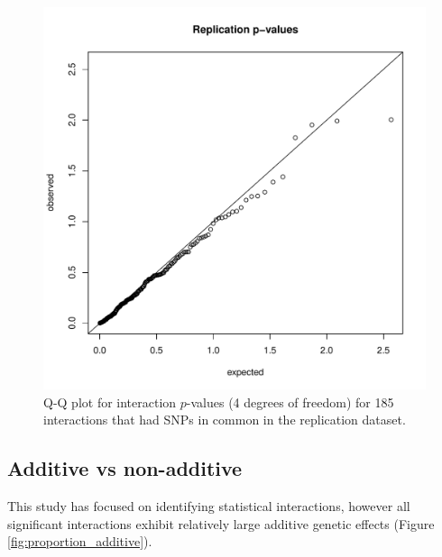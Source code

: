 \documentclass[paper=a4, fontsize=11pt]{scrartcl}	%
\numberwithin{equation}{section}									%
\numberwithin{figure}{section}										%
\numberwithin{table}{section}										%
\begin{document}
\begin{figure}[p]
	\centering
	\includegraphics[width=15cm]{images/replication_qqplot}
	\caption{Q-Q plot for interaction $p$-values (4 degrees of freedom) for 185 interactions that had SNPs in common in the replication dataset.}
	\label{fig:gg_replication}
\end{figure}



\subsection{Additive vs non-additive}

This study has focused on identifying statistical interactions, however all significant interactions exhibit relatively large additive genetic effects (Figure \ref{fig:proportion_additive}).
\end{document}
